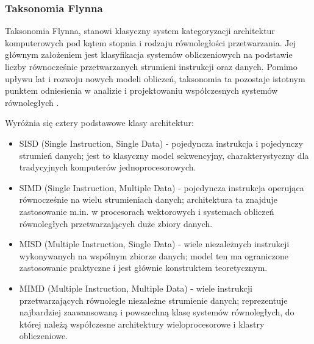 \subsubsection{Taksonomia Flynna}
Taksonomia Flynna, stanowi klasyczny system kategoryzacji architektur komputerowych pod kątem stopnia i rodzaju równoległości przetwarzania. Jej głównym założeniem jest klasyfikacja systemów obliczeniowych na podstawie liczby równocześnie przetwarzanych strumieni instrukcji oraz danych. Pomimo upływu lat i rozwoju nowych modeli obliczeń, taksonomia ta pozostaje istotnym punktem odniesienia w analizie i projektowaniu współczesnych systemów równoległych \cite{flynn1}.

Wyróżnia się cztery podstawowe klasy architektur:
\begin{itemize}
    \item SISD (Single Instruction, Single Data) - pojedyncza instrukcja i pojedynczy strumień danych; jest to klasyczny model sekwencyjny, charakterystyczny dla tradycyjnych komputerów jednoprocesorowych.
    \item SIMD (Single Instruction, Multiple Data) - pojedyncza instrukcja operująca równocześnie na wielu strumieniach danych; architektura ta znajduje zastosowanie m.in. w procesorach wektorowych i systemach obliczeń równoległych przetwarzających duże zbiory danych.
    \item MISD (Multiple Instruction, Single Data) - wiele niezależnych instrukcji wykonywanych na wspólnym zbiorze danych; model ten ma ograniczone zastosowanie praktyczne i jest głównie konstruktem teoretycznym.
    \item MIMD (Multiple Instruction, Multiple Data) - wiele instrukcji przetwarzających równolegle niezależne strumienie danych; reprezentuje najbardziej zaawansowaną i powszechną klasę systemów równoległych, do której należą współczesne architektury wieloprocesorowe i klastry obliczeniowe.
\end{itemize}

